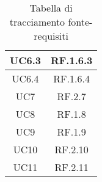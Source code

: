 \begin{table}[H]
\begin{tabular}{|c|c|}
    \rowcolor[HTML]{C0C0C0}
    UC6.3 & RF.1.6.3 \\ \hline
    \rowcolor[HTML]{EFEFEF}
    UC6.4 & RF.1.6.4 \\ \hline
    \rowcolor[HTML]{C0C0C0}
    UC7 & RF.2.7 \\ \hline
    \rowcolor[HTML]{EFEFEF}
    UC8 & RF.1.8 \\ \hline
    \rowcolor[HTML]{C0C0C0}
    UC9 & RF.1.9 \\ \hline
    \rowcolor[HTML]{EFEFEF}
    UC10 & RF.2.10 \\ \hline
    \rowcolor[HTML]{C0C0C0}
    UC11 & RF.2.11 \\ \hline
  \end{tabular}
  \caption{Tabella di tracciamento fonte-requisiti}
\end{table}

